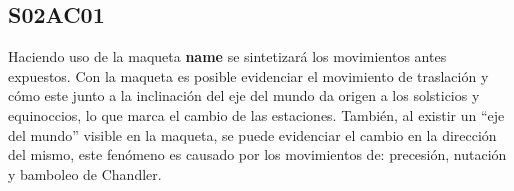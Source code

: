\documentclass[10pt,a4paper]{article}
\begin{document}
\subsection{S02AC01}
Haciendo uso de la maqueta \textbf{name} se sintetizará los movimientos antes expuestos. Con la maqueta es posible evidenciar el movimiento de traslación y cómo este junto a la inclinación del eje del mundo  da origen a los solsticios y equinoccios, lo que marca el cambio de las estaciones. También, al existir un ``eje del mundo'' visible en la maqueta, se puede evidenciar el cambio en la dirección del mismo, este fenómeno es causado por los movimientos de: precesión, nutación y bamboleo de Chandler.

\end{document}
